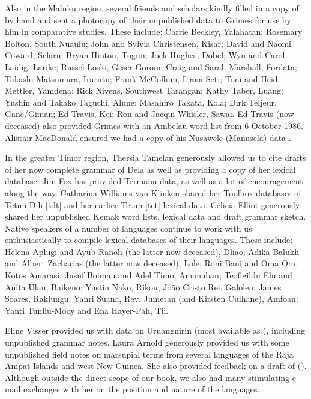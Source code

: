 Also in the Maluku region,
several friends and scholars kindly filled in a copy of \citet{GrimesC1990}
by hand and sent a photocopy of their unpublished data to Grimes
for use by him in comparative studies.
These include: Carrie Beckley, Yalahatan; Rosemary Bolton, South Nuaulu;
John and Sylvia Christensen,
Kisar; David and Naomi Coward, Selaru; Bryan Hinton, Tugun;
Jock Hughes, Dobel; Wyn and Carol Laidig,
Larike; Russel Loski, Geser-Gorom; Craig and Sarah Marshall, Fordata; Takashi Matsumura,
Irarutu; Frank McCollum, Liana-Seti; Toni and Heidi Mettler, Yamdena; Rick Nivens,
Southwest Tarangan; Kathy Taber, Luang; Yushin and Takako Taguchi,
Alune; Masahiro Takata, Kola; Dirk Teljeur, Gane/Giman; Ed Travis,
Kei; Ron and Jacqui Whisler, Sawai.
Ed Travis (now deceased) also provided Grimes with an
Ambelau word list from 6 October 1986.
Alistair MacDonald ensured we had a copy of his
Nusawele (Manusela) data \citep{MacDonald2015}.

In the greater Timor region,
Thersia Tamelan generously allowed us to cite drafts of her now complete
grammar of Dela as well as providing a copy of her lexical database.
Jim Fox has provided Termanu data,
as well as a lot of encouragement along the way.
Catharina Williams-van Klinken shared her Toolbox databases
of Tetun Dili [tdt] and her earlier Tetun [tet] lexical data.
Celicia Elliot generously shared her unpublished Kemak word lists,
lexical data and draft grammar sketch.
Native speakers of a number of languages continue to work
with us enthusiastically to compile lexical databases of their languages.
These include: Helena Aplugi and Ayub Ranoh (the latter now deceased),
Dhao; Adika Balukh and Albert Zacharias (the latter now deceased),
Lole; Roni Bani and Oma Ora,
Kotos Amarasi; Jusuf Boimau and Adel Timo,
Amanuban; Teofigildu Elu and Anita Ulan,
Baikeno; Yustin Nako, Rikou; João Cristo Rei,
Galolen; James Soares, Raklungu; Yanri Suana,
Rev. Jumetan (and Kirsten Culhane),
Amfo{\Q}an; Yanti Tunliu-Mooy and Ena Hayer-Pah, Tii.

Eline Visser provided us with data on Uruangnirin (most available as \citealp{Visser2019b,Visser2023}),
including unpublished grammar notes.
Laura Arnold generously provided us with some unpublished field notes on
marsupial terms from several languages of the Raja Ampat Islands and west New Guinea.
She also provided feedback on a draft of  ().
Although outside the direct scope of our book,
we also had many stimulating e-mail exchanges with
her on the position and nature of the  languages.

